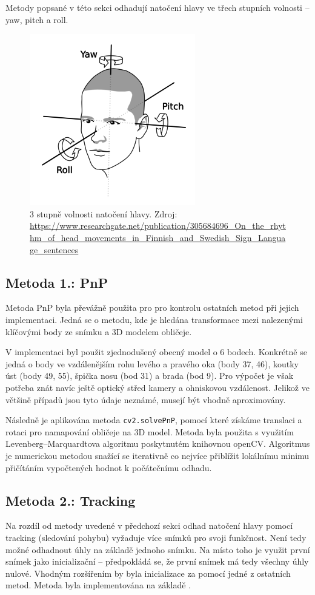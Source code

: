 \documentclass[12pt,a4paper,titlepage,final]{report}
\begin{document}
Metody popsané v této sekci odhadují natočení hlavy ve třech stupních volnosti -- yaw, pitch a roll. 

\begin{figure}[H]
    \centering
    \includegraphics[scale=2]{images/yaw_pitch_roll.png}
    \caption{3 stupně volnosti natočení hlavy. Zdroj: \url{https://www.researchgate.net/publication/305684696_On_the_rhythm_of_head_movements_in_Finnish_and_Swedish_Sign_Language_sentences}}
    \label{fig:yaw_pitch_roll}
\end{figure}

\subsection{Metoda 1.: PnP}
Metoda PnP byla převážně použita pro pro kontrolu ostatních metod při jejich implementaci. Jedná se o metodu, kde je hledána transformace mezi nalezenými klíčovými body ze snímku a 3D modelem obličeje. 

V implementaci byl použit zjednodušený obecný model o 6 bodech. Konkrétně se jedná o body ve vzdálenějším rohu levého a pravého oka (body 37, 46), koutky úst (body 49, 55), špička nosu (bod 31) a brada (bod 9). Pro výpočet je však potřeba znát navíc ještě optický střed kamery a ohniskovou vzdálenost. Jelikož ve většině případů jsou tyto údaje neznámé, musejí být vhodně aproximovány. 

Následně je aplikována metoda \texttt{cv2.solvePnP}, pomocí které získáme translaci a rotaci pro namapování obličeje na 3D model. Metoda byla použita s využitím Levenberg–Marquardtova algoritmu poskytnutém knihovnou openCV. Algoritmus je numerickou metodou snažící se iterativně co nejvíce přiblížit lokálnímu minimu přičítáním vypočtených hodnot k počátečnímu odhadu.

\subsection{Metoda 2.: Tracking}
Na rozdíl od metody uvedené v předchozí sekci odhad natočení hlavy pomocí tracking (sledování pohybu) vyžaduje více snímků pro svoji funkčnost. Není tedy možné odhadnout úhly na základě jednoho snímku. Na místo toho je využit první snímek jako inicializační -- předpokládá se, že první snímek má tedy všechny úhly nulové. Vhodným rozšířením by byla inicializace za pomocí jedné z ostatních metod. Metoda byla implementována na základě \cite{est_for_mobile}.
\end{document}
